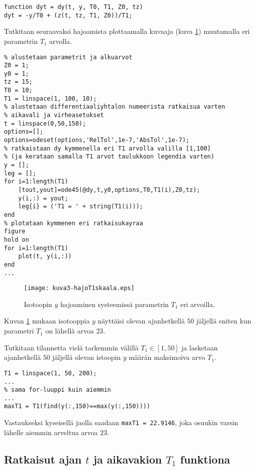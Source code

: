 \documentclass[a4paper,11pt]{article}
\begin{document}
\begin{lstlisting}
function dyt = dy(t, y, T0, T1, Z0, tz)
dyt = -y/T0 + (z(t, tz, T1, Z0))/T1;
\end{lstlisting}

Tutkitaan seuraavaksi hajoamista plottaamalla kuvaaja (kuva \ref{fig:hajo1}) muutamalla eri parametrin $T_1$ arvolla.

\begin{lstlisting}
% alustetaan parametrit ja alkuarvot
Z0 = 1;
y0 = 1;
tz = 15;
T0 = 10;
T1 = linspace(1, 100, 10);
% alustetaan differentiaaliyhtalon numeerista ratkaisua varten
% aikavali ja virheasetukset
t = linspace(0,50,150);
options=[];
options=odeset(options,'RelTol',1e-7,'AbsTol',1e-7);
% ratkaistaan dy kymmenella eri T1 arvolla valilla [1,100]
% (ja kerataan samalla T1 arvot taulukkoon legendia varten)
y = [];
leg = [];
for i=1:length(T1)
    [tout,yout]=ode45(@dy,t,y0,options,T0,T1(i),Z0,tz);
    y(i,:) = yout;
    leg{i} = ('T1 = ' + string(T1(i)));
end
% plotataan kymmenen eri ratkaisukayraa
figure
hold on
for i=1:length(T1)
    plot(t, y(i,:))
end
...
\end{lstlisting}

\begin{figure}
    \centering
    \texttt{[image: kuva3-hajoT1skaala.eps]}
    \caption{Isotoopin $y$ hajoaminen systeemissä parametrin $T_1$ eri arvoilla.}
    \label{fig:hajo1}
\end{figure}

Kuvan \ref{fig:hajo1} mukaan isotooppia $y$ näyttäisi olevan ajanhetkellä $50$ jäljellä eniten kun parametri $T_1$ on lähellä arvoa $23$.

Tutkitaan tilannetta vielä tarkemmin välillä $T_1 \in [1, 50]$ ja lasketaan ajanhetkellä $50$ jäljellä olevan istoopin $y$ määrän maksimoiva arvo $T_1$.

\begin{lstlisting}
T1 = linspace(1, 50, 200);
...
% sama for-luuppi kuin aiemmin
...
maxT1 = T1(find(y(:,150)==max(y(:,150))))
\end{lstlisting}

Vastaukseksi kyseisellä jaolla saadaan \texttt{maxT1 = 22.9146}, joka osuukin varsin lähelle aiemmin arveltua arvoa $23$.

\subsection{Ratkaisut ajan $t$ ja aikavakion $T_1$ funktiona}
\label{taydennys1}
\end{document}
